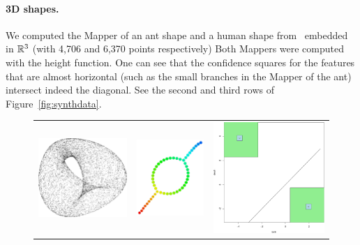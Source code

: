 \paragraph{3D shapes.}
We computed the Mapper of an ant shape and a human shape from~\cite{Chen09} embedded in $\mathbb{R}^3$ (with 4,706 and 6,370 points respectively) 
Both Mappers were computed with the height function.
One can see that the confidence squares for the 
features that are almost horizontal (such as the 
small branches in the Mapper of the ant) intersect indeed the diagonal. 
See the second and third rows of Figure~\ref{fig:synthdata}.

\begin{figure}
\begin{tabular}{ccc}
\includegraphics[width=4cm]{figures/KleinBottle4Dr1a3.pdf} & \includegraphics[width=3cm]{figures/KleinBottle4Dr1a3_mappercoord0_subs100_g40.pdf} &  \includegraphics[width=5cm]{figures/KleinBottle4Dr1a3_conf85_boot100.pdf} \\

\end{tabular}
\end{figure}
